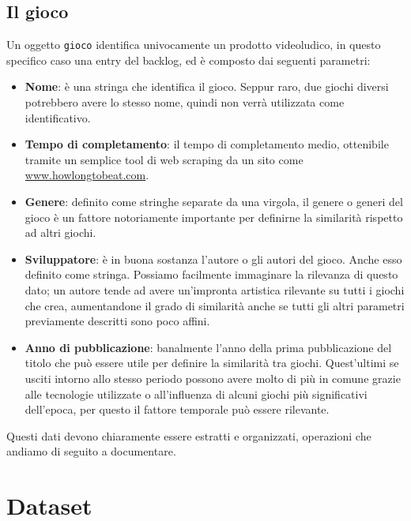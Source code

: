     \subsection{Il gioco}
        Un oggetto \texttt{gioco} identifica univocamente un prodotto videoludico, in questo specifico caso una entry del backlog, ed è composto dai seguenti parametri:
        \begin{itemize}
            \item \textbf{Nome}: è una stringa che identifica il gioco. Seppur raro, due giochi diversi potrebbero avere lo stesso nome, quindi non verrà utilizzata come identificativo.
            
            \item \textbf{Tempo di completamento}: il tempo di completamento medio, ottenibile tramite un semplice tool di web scraping da un sito come \url{www.howlongtobeat.com}.
          
            \item \textbf{Genere}: definito come stringhe separate da una virgola, il genere o generi del gioco è un fattore notoriamente importante per definirne la similarità rispetto ad altri giochi.
           
            \item \textbf{Sviluppatore}: è in buona sostanza l'autore o gli autori del gioco. Anche esso definito come stringa. Possiamo facilmente immaginare la rilevanza di questo dato; un autore tende ad avere un'impronta artistica rilevante su tutti i giochi che crea, aumentandone il grado di similarità anche se tutti gli altri parametri previamente descritti sono poco affini.
            
            \item \textbf{Anno di pubblicazione}: banalmente l'anno della prima pubblicazione del titolo che può essere utile per definire la similarità tra giochi. Quest'ultimi se usciti intorno allo stesso periodo possono avere molto di più in comune grazie alle tecnologie utilizzate o all'influenza di alcuni giochi più significativi dell'epoca, per questo il fattore temporale può essere rilevante.
        \end{itemize}
        
        Questi dati devono chiaramente essere estratti e organizzati, operazioni che andiamo di seguito a documentare.
        
\section{Dataset}
